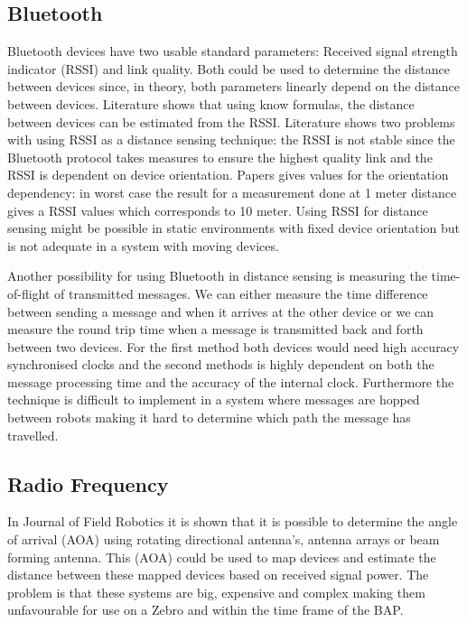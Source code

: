 \subsection*{Bluetooth}

Bluetooth devices have two usable standard parameters: Received signal strength indicator (RSSI) and link quality. Both could be used to determine the distance between devices since, in theory, both parameters linearly depend on the distance between devices. Literature shows that using know formulas, the distance between devices can be estimated from the RSSI. Literature \cite{Forno2005} shows two problems with using RSSI as a distance sensing technique: the RSSI is not stable since the Bluetooth protocol takes measures to ensure the highest quality link and the RSSI is dependent on device orientation. Papers \cite{Scheerens2012,Dahlgren2014} gives values for the orientation dependency: in worst case the result for a measurement done at 1 meter distance gives a RSSI values which corresponds to 10 meter. Using RSSI for distance sensing might be possible in static environments with fixed device orientation but is not adequate in a system with moving devices.

Another possibility for using Bluetooth in distance sensing is measuring the time-of-flight of transmitted messages. We can either measure the time difference between sending a message and when it arrives at the other device or we can measure the round trip time when a message is transmitted back and forth between two devices. For the first method both devices would need high accuracy synchronised clocks \cite{Ekberg2009} and the second methods is highly dependent on both the message processing time and the accuracy of the internal clock. Furthermore the technique is difficult to implement in a system where messages are hopped between robots making it hard to determine which path the message has travelled.

\subsection*{Radio Frequency}

In Journal of Field Robotics \cite{Min2016} it is shown that it is possible to determine the angle of arrival (AOA) using rotating directional antenna's, antenna arrays or beam forming antenna. This (AOA) could be used to map devices and estimate the distance between these mapped devices based on received signal power. The problem is that these systems are big, expensive and complex making them unfavourable for use on a Zebro and within the time frame of the BAP.

